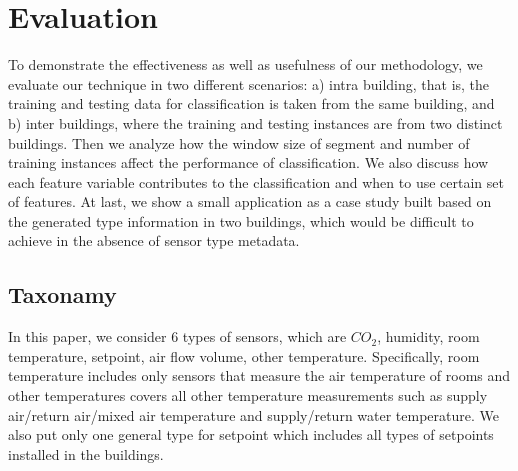 
\section{Evaluation}
To demonstrate the effectiveness as well as usefulness of our methodology, we evaluate our technique in two different scenarios: a) intra building, that is, the 
training and testing data for classification is taken from the same building, and b) inter buildings, where the training and testing instances are from two 
distinct buildings. Then we analyze how the window size of segment and number of training instances affect the performance of classification. We also discuss how 
each feature variable contributes to the classification and when to use certain set of features. At last, we show a small application as a case study built based on 
the generated type information in two buildings, which would be difficult to achieve in the absence of sensor type metadata. 

\subsection{Taxonamy}
In this paper, we consider 6 types of sensors, which are $CO_{2}$, humidity, room temperature, setpoint, air flow volume, other temperature. Specifically, room 
temperature includes only sensors that measure the air temperature of rooms and other temperatures covers all other temperature measurements such as supply 
air/return air/mixed air temperature and supply/return water temperature. We also put only one general type for setpoint which includes all types of setpoints 
installed in the buildings.

